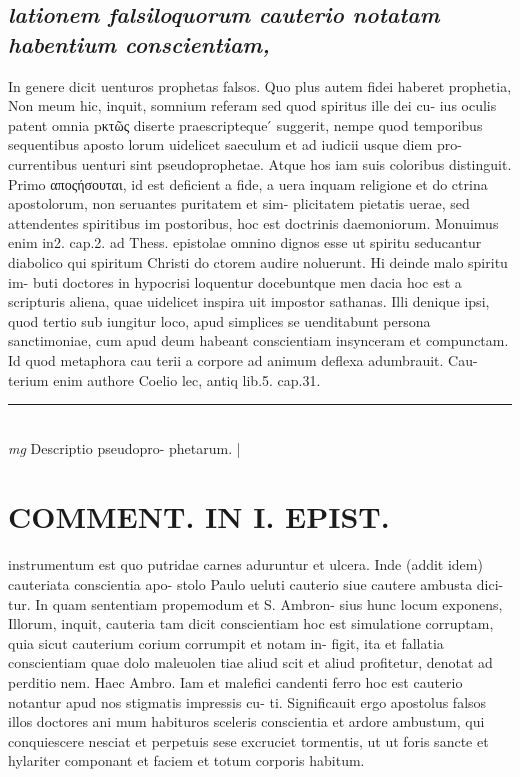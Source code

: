 \documentclass{article}
\begin{document}
\begin{pages}
\subsection*{\textit{lationem falsiloquorum cauterio notatam habentium conscientiam, }}\pstart In genere dicit uenturos prophetas falsos. Quo plus autem fidei haberet prophetia, Non meum hic, inquit, somnium referam sed quod spiritus ille dei cu- ius oculis patent omnia pκτῶς diserte praescripteque ́ suggerit, nempe quod temporibus sequentibus aposto lorum uidelicet saeculum et ad iudicii usque diem pro- currentibus uenturi sint pseudoprophetae. Atque hos iam suis coloribus distinguit. Primo αποςήσουται, id est deficient a fide, a uera inquam religione et do ctrina apostolorum, non seruantes puritatem et sim- plicitatem pietatis uerae, sed attendentes spiritibus im postoribus, hoc est doctrinis daemoniorum. Monuimus enim in2. cap.2. ad Thess. epistolae omnino dignos esse ut spiritu seducantur diabolico qui spiritum Christi do ctorem audire noluerunt. Hi deinde malo spiritu im- buti doctores in hypocrisi loquentur docebuntque men dacia hoc est a scripturis aliena, quae uidelicet inspira uit impostor sathanas. Illi denique ipsi, quod tertio sub iungitur loco, apud simplices se uenditabunt persona sanctimoniae, cum apud deum habeant conscientiam insynceram et compunctam. Id quod metaphora cau terii a corpore ad animum deflexa adumbrauit. Cau- terium enim authore Coelio lec, antiq lib.5. cap.31.  \pend
\vspace{0.5cm}\noindent
\vspace{0.2cm}\rule{1cm}{0.2pt}\\ 
\hspace{0.2cm}\textit{mg}
\footnotesize Descriptio pseudopro- phetarum. 
\normalsize| 
\section*{COMMENT. IN I. EPIST. }\pstart instrumentum est quo putridae carnes aduruntur et ulcera. Inde (addit idem) cauteriata conscientia apo- stolo Paulo ueluti cauterio siue cautere ambusta dici- tur. In quam sententiam propemodum et S. Ambron- sius hunc locum exponens, Illorum, inquit, cauteria tam dicit conscientiam hoc est simulatione corruptam, quia sicut cauterium corium corrumpit et notam in- figit, ita et fallatia conscientiam quae dolo maleuolen tiae aliud scit et aliud profitetur, denotat ad perditio nem. Haec Ambro. Iam et malefici candenti ferro hoc est cauterio notantur apud nos stigmatis impressis cu- ti. Significauit ergo apostolus falsos illos doctores ani mum habituros sceleris conscientia et ardore ambustum, qui conquiescere nesciat et perpetuis sese excruciet tormentis, ut ut foris sancte et hylariter componant et faciem et totum corporis habitum.  \pend
{}
{}

\end{pages}
\end{document}
